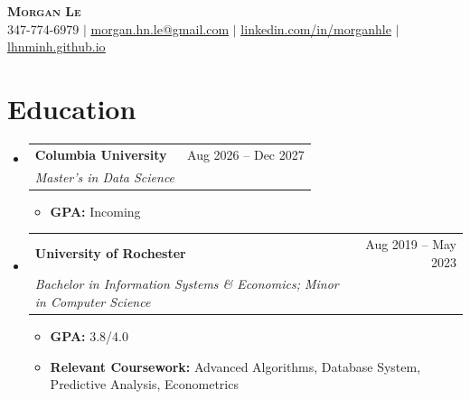 \documentclass[a4paper,11pt]{article}
\makeatletter
\newcommand{\resumeItem}[1]{
  \item\small{
    {#1 \vspace{-2pt}}
  }
}
\newcommand{\resumeSubheading}[4]{
  \vspace{-2pt}\item
    \begin{tabular*}{0.97\textwidth}[t]{l@{\extracolsep{\fill}}r}
      \textbf{#1} & #2 \\
      \textit{\small#3} & \textit{\small #4} \\
    \end{tabular*}\vspace{-7pt}
}
\newcommand{\resumeSubHeadingListStart}{\begin{itemize}[leftmargin=0.15in, label={}]}
\newcommand{\resumeSubHeadingListEnd}{\end{itemize}}
\newcommand{\resumeItemListStart}{\begin{itemize}}
\newcommand{\resumeItemListEnd}{\end{itemize}\vspace{-5pt}}
\makeatother
\begin{document}
\begin{center}
    \textbf{\Huge \scshape Morgan Le} \\ \vspace{1pt}
    \small 347-774-6979 $|$
    \href{mailto:morgan.hn.le@gmail.com}{\underline{morgan.hn.le@gmail.com}} $|$
    \href{https://www.linkedin.com/in/morganhle/}{\underline{linkedin.com/in/morganhle}} $|$
    \href{https://lhnminh.github.io/}{\underline{lhnminh.github.io}}
\end{center}

\section{Education}
\resumeSubHeadingListStart
  \resumeSubheading
    {Columbia University}{Aug 2026 -- Dec 2027}
    {Master's in Data Science}{}
    \resumeItemListStart
      \resumeItem{\textbf{GPA:} Incoming}
    \resumeItemListEnd
  \resumeSubheading
    {University of Rochester}{Aug 2019 -- May 2023}
    {Bachelor in Information Systems \& Economics; Minor in Computer Science}{}
    \resumeItemListStart
      \resumeItem{\textbf{GPA:} 3.8/4.0}
      \resumeItem{\textbf{Relevant Coursework:} Advanced Algorithms, Database System, Predictive Analysis, Econometrics}
    \resumeItemListEnd
\resumeSubHeadingListEnd
\end{document}
